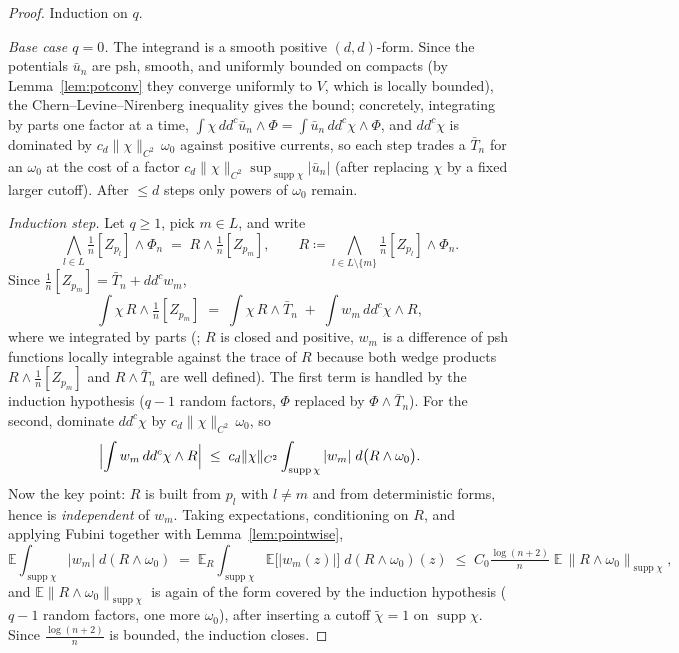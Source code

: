 \documentclass[12pt]{article}
\def\E{\mathbb{E}}
\def\ddc{dd^c}
\DeclareMathOperator{\supp}{supp}
\begin{document}
\begin{proof}
Induction on $q$.

\emph{Base case $q = 0$.} The integrand is a smooth positive $(d,d)$-form. Since the
potentials $\bar u_n$ are psh, smooth, and uniformly bounded on compacts (by
Lemma~\ref{lem:potconv} they converge uniformly to $V$, which is locally bounded), the
Chern--Levine--Nirenberg inequality gives the bound; concretely, integrating by parts
one factor at a time,
$\int \chi\, \ddc \bar u_n \wedge \Phi = \int \bar u_n\, \ddc\chi \wedge \Phi$, and
$\ddc \chi$ is dominated by $c_d \|\chi\|_{C^2}\, \omega_0$ against positive currents,
so each step trades a $\bar T_n$ for an $\omega_0$ at the cost of a factor
$c_d \|\chi\|_{C^2} \sup_{\supp\chi} |\bar u_n|$ (after replacing $\chi$ by a fixed
larger cutoff). After $\le d$ steps only powers of $\omega_0$ remain.

\emph{Induction step.} Let $q \ge 1$, pick $m \in L$, and write
\[
  \bigwedge_{l\in L} \tfrac1n [Z_{p_l}] \wedge \Phi_n
  \;=\; R \wedge \tfrac1n [Z_{p_m}],
  \qquad
  R \coloneqq \bigwedge_{l\in L\setminus\{m\}} \tfrac1n [Z_{p_l}] \wedge \Phi_n .
\]
Since $\tfrac1n [Z_{p_m}] = \bar T_n + \ddc w_m$,
\[
  \int \chi\, R \wedge \tfrac1n [Z_{p_m}]
  \;=\; \int \chi\, R \wedge \bar T_n
  \;+\; \int w_m \, \ddc\chi \wedge R ,
\]
where we integrated by parts (\cite[Ch.~III, \S3]{Dem}; $R$ is closed and positive, $w_m$
is a difference of psh functions locally integrable against the trace of $R$ because
both wedge products $R \wedge \frac1n[Z_{p_m}]$ and $R \wedge \bar T_n$ are well
defined). The first term is handled by the induction hypothesis ($q-1$ random factors,
$\Phi$ replaced by $\Phi \wedge \bar T_n$). For the second, dominate
$\ddc \chi$ by $c_d \|\chi\|_{C^2}\, \omega_0$, so
\[
  \Bigl| \int w_m\, \ddc \chi \wedge R \Bigr|
  \;\le\; c_d \|\chi\|_{C^2} \int_{\supp \chi} |w_m|\; d\bigl( R \wedge \omega_0 \bigr).
\]
Now the key point: $R$ is built from $p_l$ with $l \neq m$ and from deterministic forms,
hence is \emph{independent} of $w_m$. Taking expectations, conditioning on $R$, and
applying Fubini together with Lemma~\ref{lem:pointwise},
\[
  \E \int_{\supp\chi} |w_m| \; d(R\wedge\omega_0)
  \;=\; \E_R \int_{\supp\chi} \E\bigl[|w_m(z)|\bigr]\; d(R\wedge\omega_0)(z)
  \;\le\; C_0 \tfrac{\log(n+2)}{n}\; \E\, \| R \wedge \omega_0 \|_{\supp\chi},
\]
and $\E \|R \wedge \omega_0\|_{\supp\chi}$ is again of the form covered by the induction
hypothesis ($q - 1$ random factors, one more $\omega_0$), after inserting a cutoff
$\tilde\chi = 1$ on $\supp \chi$. Since $\frac{\log(n+2)}{n}$ is bounded, the induction
closes.
\end{proof}
\end{document}
